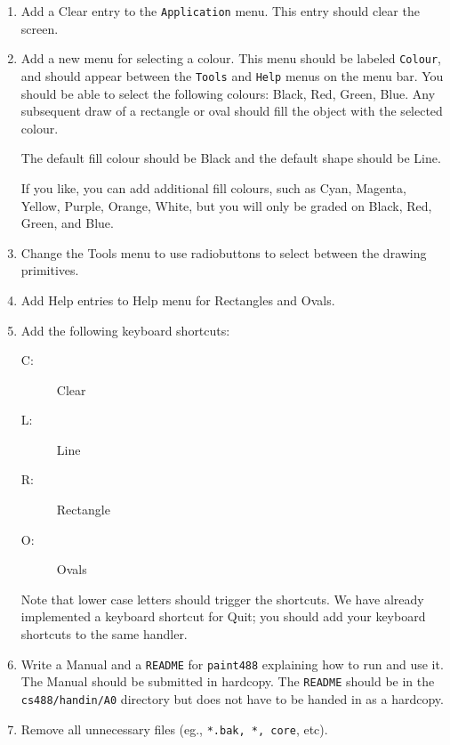 \begin{enumerate}
        \item
                Add a Clear entry to the \texttt{Application} menu.  This entry should
                clear the screen.

        \item
                Add a new menu for selecting a colour.  This menu should
                be labeled \texttt{Colour}, and should appear between the
                \texttt{Tools} and \texttt{Help} menus on the menu bar.  You should
                be able to select the following colours: Black, Red,
                Green, Blue.
                Any subsequent draw of a rectangle or oval should fill
                the object with the selected colour.

                The default fill colour should be Black and the
                default shape should be Line.

                If you like, you can add additional fill colours, such
                as Cyan, Magenta, Yellow, Purple, Orange,
                White, but you will only be graded on Black, Red, Green,
                and Blue.
        \item
                Change the Tools menu to use radiobuttons to select
                between the drawing primitives.

        \item
                Add Help entries to Help menu for Rectangles and Ovals.

        \item
                Add the following keyboard shortcuts:
                \begin{description}
                        \item[C:] Clear
                        \item[L:] Line
                        \item[R:] Rectangle
                        \item[O:] Ovals
                \end{description}
		Note that lower case letters should
		trigger the shortcuts.  We have already implemented
		a keyboard shortcut for Quit; you should add your
		keyboard shortcuts to the same handler.

        \item
                Write a Manual and a \texttt{README} for \texttt{paint488} 
                explaining how to run and use it.  
                The Manual should be submitted in hardcopy.
                The \texttt{README} should be in the \texttt{cs488/handin/A0} 
                directory but does not have to be handed in as a hardcopy.  
        \item
                Remove all unnecessary files (eg., 
                        \texttt{*.bak, *{}, core}, etc).


\end{enumerate}
